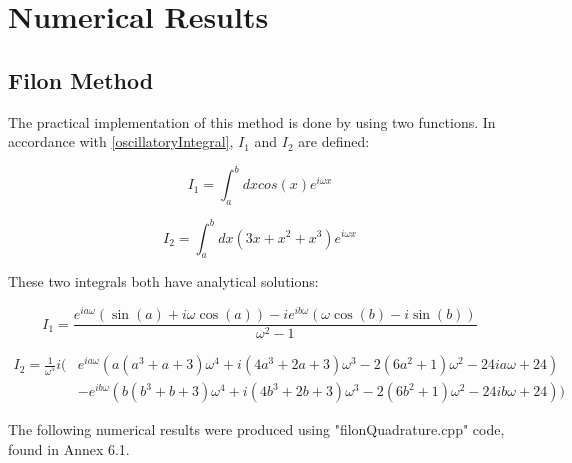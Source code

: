 \chapter{Numerical Results}

\section{Filon Method}

The practical implementation of this method is done by using two functions. In accordance with \eqref{oscillatoryIntegral}, $I_1$ and $I_2$ are defined:


\begin{equation}
      I_1=\int_a^{b}dx cos(x)e^{i\omega x}
\end{equation}

\begin{equation}
      I_2 =\int_a^{b}dx (3x+x^2+x^3)e^{i\omega x} 
\end{equation}

These two integrals both have analytical solutions:

\begin{equation}
  I_1=\frac{e^{i a \omega } (\sin (a)+i \omega  \cos (a))-i e^{i b \omega } (\omega  \cos (b)-i \sin (b))}{\omega ^2-1}
\end{equation}

\begin{equation}
  \begin{aligned}
    I_2=\frac{1}{\omega^5}i (&e^{i a \omega } (a (a^3+a+3) \omega ^4+i (4 a^3+2 a+3) \omega ^3-2 (6 a^2+1) \omega ^2-24 i a \omega +24)\\
                             &-e^{i b \omega } (b (b^3+b+3) \omega ^4+i (4 b^3+2 b+3) \omega ^3-2 (6 b^2+1) \omega ^2-24 i b \omega +24))
  \end{aligned}
\end{equation}

\vspace{3in}

\pagebreak

The following numerical results were produced using "filonQuadrature.cpp" code, found in Annex 6.1.

